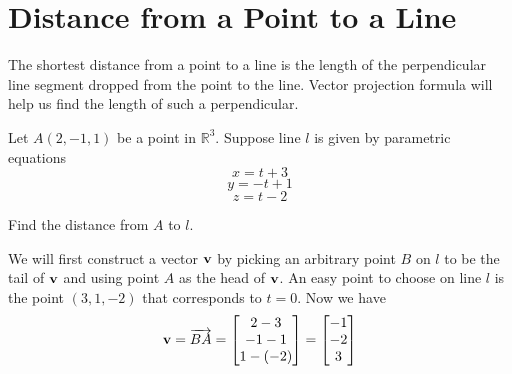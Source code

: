 \documentclass{ximera}
\renewcommand{\vec}[1]{{\bf #1}}
\newcommand{\RR}{\mathbb{R}}
\begin{document}
\section*{Distance from a Point to a Line}

The shortest distance from a point to a line is the length of the perpendicular line segment dropped from the point to the line.  Vector projection formula will help us find the length of such a perpendicular.

\begin{example}
Let $A(2, -1, 1)$ be a point in $\RR^3$.  Suppose line $l$ is given by parametric equations $$x=t+3$$
$$y=-t+1$$
$$z=t-2$$

\begin{image}[2in]
\end{image}

Find the distance from $A$ to $l$.
\begin{explanation}
We will first construct a vector $\vec{v}$ by picking an arbitrary point $B$ on $l$ to be the tail of $\vec{v}$ and using point $A$ as the head of $\vec{v}$.  An easy point to choose on line $l$ is the point $(3, 1, -2)$ that corresponds to $t=0$.  Now we have 
$$\vec{v}=\overrightarrow{BA}=\begin{bmatrix}2-3\\-1-1\\1-(-2)\end{bmatrix}=\begin{bmatrix}-1\\-2\\3\end{bmatrix}$$

\begin{image}[2in]
\end{image}


\end{explanation}
\end{example}
\end{document}
